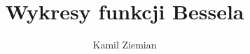 \documentclass[a4paper,11pt]{article}
\title{Wykresy funkcji Bessela}
\author{Kamil Ziemian}
\numberwithin{equation}{section}
\begin{document}





\maketitle





\begin{figure}

  \label{fig:Bessel-function-zero-order-Part-I}


  \centering

  \begin{tikzpicture}


\end{tikzpicture}
\end{figure}
\end{document}
